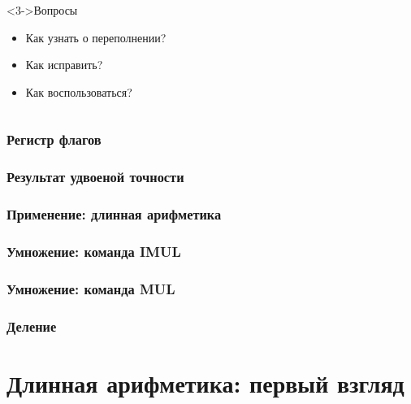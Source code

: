 \documentclass[pdf,9pt,aspectratio=169]{beamer}
\begin{document}
\begin{frame}[fragile]
\begin{columns}[T]
\begin{column}[]{0.45\textwidth}
\begin{alertblock}
\begin{center}
        \end{center}
      \end{alertblock}
    \end{column}
  \end{columns}
\hspace{1cm}
  \begin{columns}[T]
    \begin{column}[]{0.45\textwidth}  
      \begin{block}<3->{Вопросы}
        \begin{itemize}
          \item Как узнать о переполнении?
          \item Как исправить?
          \item Как воспользоваться?
       \end{itemize}
     \end{block}
    \end{column}
  \end{columns}
\end{frame}

\begin{frame}[fragile]\frametitle{Регистр флагов}
\end{frame}

\begin{frame}[fragile]\frametitle{Результат удвоеной точности}
\end{frame}

\begin{frame}[fragile]\frametitle{Применение: длинная арифметика}
\end{frame}

\begin{frame}[fragile]\frametitle{Умножение: команда IMUL}
\end{frame}

\begin{frame}[fragile]\frametitle{Умножение: команда MUL}
\end{frame}

\begin{frame}[fragile]\frametitle{Деление}
\end{frame}

\section{Длинная арифметика: первый взгляд}
\end{document}
